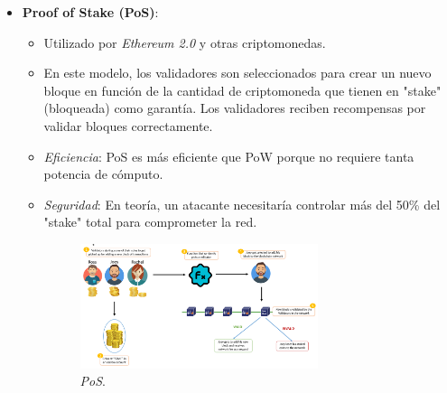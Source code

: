 \begin{itemize}
    \item \textbf{Proof of Stake (PoS)}:
    \begin{itemize}
        \item Utilizado por \textit{Ethereum 2.0} y otras criptomonedas.
        \item En este modelo, los validadores son seleccionados para crear un nuevo bloque en función de la cantidad de criptomoneda que tienen en "stake" (bloqueada) como garantía. Los validadores reciben recompensas por validar bloques correctamente.
        \item \textit{Eficiencia}: PoS es más eficiente que PoW porque no requiere tanta potencia de cómputo.
        \item \textit{Seguridad}: En teoría, un atacante necesitaría controlar más del 50\% del "stake" total para comprometer la red.
        \begin{figure}[!htbp]
            \centering
            \includegraphics[width=0.7\textwidth]{./Graphics/PoS.png}
            \caption{\textit{PoS}.}
            \label{fig:PoS}
        \end{figure} 
    \end{itemize}

\

\


\end{itemize}
